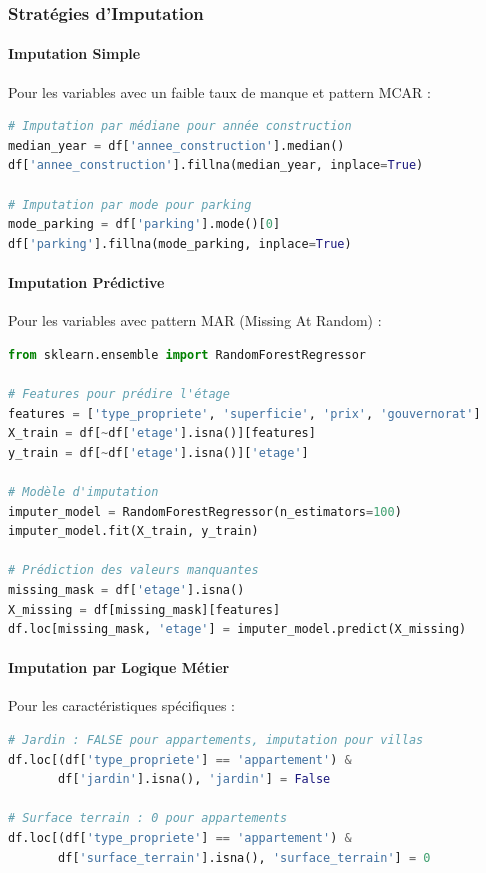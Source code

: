 \subsubsection{Stratégies d'Imputation}

\paragraph{Imputation Simple}
Pour les variables avec un faible taux de manque et pattern MCAR :

\begin{lstlisting}[language=Python,caption=Imputation Simple]
# Imputation par médiane pour année construction
median_year = df['annee_construction'].median()
df['annee_construction'].fillna(median_year, inplace=True)

# Imputation par mode pour parking
mode_parking = df['parking'].mode()[0]
df['parking'].fillna(mode_parking, inplace=True)
\end{lstlisting}

\paragraph{Imputation Prédictive}
Pour les variables avec pattern MAR (Missing At Random) :

\begin{lstlisting}[language=Python,caption=Imputation Prédictive pour Étage]
from sklearn.ensemble import RandomForestRegressor

# Features pour prédire l'étage
features = ['type_propriete', 'superficie', 'prix', 'gouvernorat']
X_train = df[~df['etage'].isna()][features]
y_train = df[~df['etage'].isna()]['etage']

# Modèle d'imputation
imputer_model = RandomForestRegressor(n_estimators=100)
imputer_model.fit(X_train, y_train)

# Prédiction des valeurs manquantes
missing_mask = df['etage'].isna()
X_missing = df[missing_mask][features]
df.loc[missing_mask, 'etage'] = imputer_model.predict(X_missing)
\end{lstlisting}

\paragraph{Imputation par Logique Métier}
Pour les caractéristiques spécifiques :

\begin{lstlisting}[language=Python,caption=Imputation Logique Métier]
# Jardin : FALSE pour appartements, imputation pour villas
df.loc[(df['type_propriete'] == 'appartement') & 
       df['jardin'].isna(), 'jardin'] = False

# Surface terrain : 0 pour appartements
df.loc[(df['type_propriete'] == 'appartement') & 
       df['surface_terrain'].isna(), 'surface_terrain'] = 0
\end{lstlisting}

